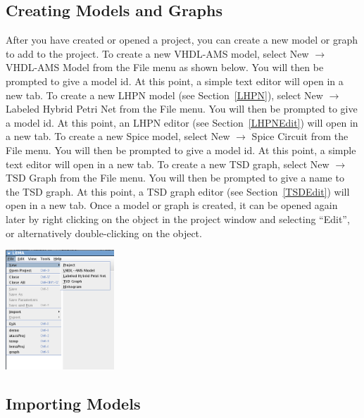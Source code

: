 \documentclass[titlepage,11pt]{article}
\begin{document}
\subsection{Creating Models and Graphs}

\noindent
After you have created or opened a project, you can create a
new model or graph to add to the project.  To create a new 
VHDL-AMS model, select  New $\rightarrow$ VHDL-AMS Model from the
File menu as shown below. You will then be prompted to give a model id. At this
point, a simple text editor will open in a new tab. To create a new LHPN model 
(see Section~\ref{LHPN}), select New $\rightarrow$ Labeled Hybrid Petri Net from
the File menu. You will then be prompted to give a model id.  At this point, an
LHPN editor (see Section~\ref{LHPNEdit}) will open in a new tab. To create a new
Spice model, select New $\rightarrow$ Spice Circuit from the File menu.  You
will then be prompted to give a model id.  At this point, a simple text editor
will open in a new tab.  To create a new TSD graph, select New $\rightarrow$ TSD
Graph from the File menu. You will then
be prompted to give a name to the TSD graph.  At this point, a TSD graph editor
(see Section~\ref{TSDEdit}) will open in a new tab.   Once a model or graph is 
created, it can be opened again later by right clicking on the object in the
project window and selecting ``Edit'', or alternatively
double-clicking on the object.
\begin{center}
\includegraphics[height=45mm]{screenshots/newModelLema}
\end{center}

\subsection{Importing Models}
\end{document}
